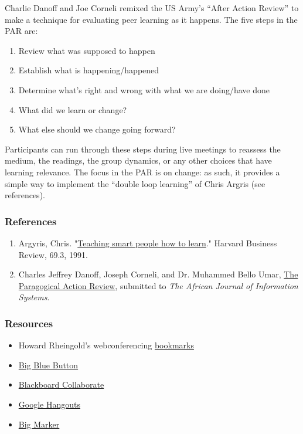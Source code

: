 Charlie Danoff and Joe Corneli remixed the US Army's ``After Action
Review'' to make a technique for evaluating peer learning as it happens.
The five steps in the PAR are:

\begin{enumerate}
\item
  Review what was supposed to happen
\item
  Establish what is happening/happened
\item
  Determine what's right and wrong with what we are doing/have done
\item
  What did we learn or change?
\item
  What else should we change going forward?
\end{enumerate}
Participants can run through these steps during live meetings to
reassess the medium, the readings, the group dynamics, or any other
choices that have learning relevance. The focus in the PAR is on change:
as such, it provides a simple way to implement the ``double loop
learning'' of Chris Argris (see references).

\subsubsection{\textbf{References}}

\begin{enumerate}
\item
  Argyris, Chris.
  "\href{http://pds8.egloos.com/pds/200805/20/87/chris\_argyris\_learning.pdf}{Teaching
  smart people how to learn}." Harvard Business Review, 69.3, 1991.
\item
  Charles Jeffrey Danoff, Joseph Corneli, and Dr. Muhammed Bello Umar,
  \href{http://metameso.org/~joe/docs/The-Paragogical-Action-Review.pdf}{The
  Paragogical Action Review}, submitted to \emph{The African Journal of
  Information Systems}.
\end{enumerate}
\subsubsection{\textbf{Resources}}

\begin{itemize}
\item
  Howard Rheingold's webconferencing
  \href{http://delicious.com/hrheingold/webconferencing}{bookmarks}
\item
  \href{http://www.bigbluebutton.org/}{Big Blue Button}
\item
  \href{http://www.blackboard.com/platforms/collaborate/overview.aspx}{Blackboard
  Collaborate}
\item
  \href{http://www.google.com/+/learnmore/hangouts/}{Google Hangouts}
\item
  \href{http://www.bigmarker.com/about}{Big Marker}
\end{itemize}
